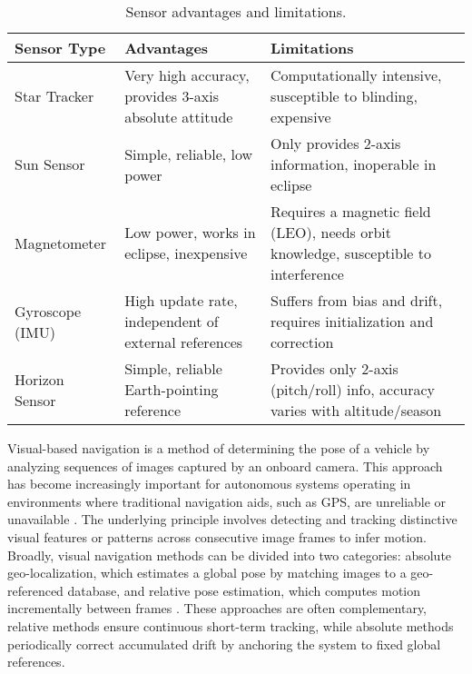 \begin{table}[H]
\centering
\renewcommand{\arraystretch}{1.15}
\begin{tabularx}{\textwidth}{@{} l >{\raggedright\arraybackslash}X >{\raggedright\arraybackslash}X @{}}
\toprule
\textbf{Sensor Type} & \textbf{Advantages} & \textbf{Limitations} \\
\midrule
Star Tracker      & Very high accuracy, provides 3-axis absolute attitude & Computationally intensive, susceptible to blinding, expensive \\
Sun Sensor        & Simple, reliable, low power & Only provides 2-axis information, inoperable in eclipse \\
Magnetometer      & Low power, works in eclipse, inexpensive & Requires a magnetic field (LEO), needs orbit knowledge, susceptible to interference \\
Gyroscope (IMU)   & High update rate, independent of external references & Suffers from bias and drift, requires initialization and correction \\
Horizon Sensor    & Simple, reliable Earth-pointing reference & Provides only 2-axis (pitch/roll) info, accuracy varies with altitude/season \\
\bottomrule
\end{tabularx}
\caption{Sensor advantages and limitations.}
\label{tab:sensors_advantages_limitations}
\end{table}


\noindent
Visual-based navigation is a method of determining the pose of a vehicle by analyzing sequences of images captured by an onboard camera. This approach has become increasingly important for autonomous systems operating in environments where traditional navigation aids, such as GPS, are unreliable or unavailable \cite{Parra}. The underlying principle involves detecting and tracking distinctive visual features or patterns across consecutive image frames to infer motion. Broadly, visual navigation methods can be divided into two categories: absolute geo-localization, which estimates a global pose by matching images to a geo-referenced database, and relative pose estimation, which computes motion incrementally between frames \cite{Chen2021, Parra}. These approaches are often complementary, relative methods ensure continuous short-term tracking, while absolute methods periodically correct accumulated drift by anchoring the system to fixed global references.
\vspace{0.5cm}

